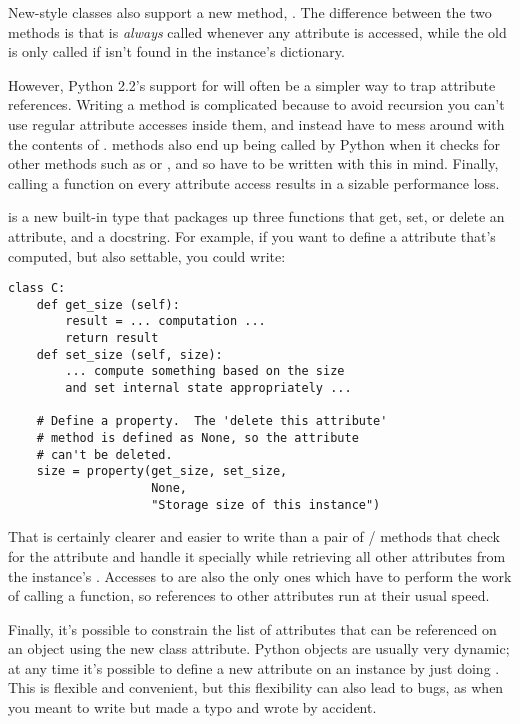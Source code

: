 \documentclass{howto}
\begin{document}
New-style classes also support a new method,
.  The difference between
the two methods is that  is \emph{always}
called whenever any attribute is accessed, while the old
 is only called if  isn't found in the
instance's dictionary.

However, Python 2.2's support for  will often be a
simpler way to trap attribute references.  Writing a
 method is complicated because to avoid recursion
you can't use regular attribute accesses inside them, and instead have
to mess around with the contents of .
 methods also end up being called by Python when
it checks for other methods such as  or
, and so have to be written with this in mind.
Finally, calling a function on every attribute access results in a
sizable performance loss.

 is a new built-in type that packages up three
functions that get, set, or delete an attribute, and a docstring.  For
example, if you want to define a  attribute that's
computed, but also settable, you could write:

\begin{verbatim}
class C:
    def get_size (self):
        result = ... computation ...
        return result
    def set_size (self, size):
        ... compute something based on the size
        and set internal state appropriately ...

    # Define a property.  The 'delete this attribute'
    # method is defined as None, so the attribute
    # can't be deleted.
    size = property(get_size, set_size,
                    None,
                    "Storage size of this instance")
\end{verbatim}

That is certainly clearer and easier to write than a pair of
/ methods that check for the
 attribute and handle it specially while retrieving all
other attributes from the instance's .  Accesses to
 are also the only ones which have to perform the work of
calling a function, so references to other attributes run at
their usual speed.

Finally, it's possible to constrain the list of attributes that can be
referenced on an object using the new  class attribute.
Python objects are usually very dynamic; at any time it's possible to
define a new attribute on an instance by just doing
.  This is flexible and convenient, but this
flexibility can also lead to bugs, as when you meant to write
 but made a typo and wrote
 by accident.  
\end{document}
